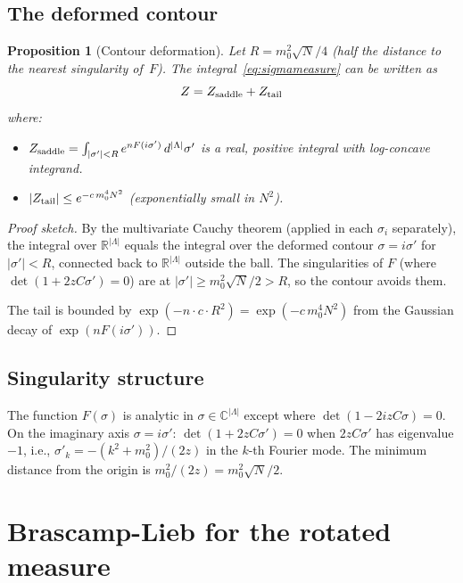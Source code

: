 \documentclass[12pt]{article}
\newtheorem{proposition}[theorem]{Proposition}
\theoremstyle{definition}
\theoremstyle{remark}
\newcommand{\R}{\mathbb{R}}
\newcommand{\C}{\mathbb{C}}
\newcommand{\La}{\Lambda}
\begin{document}
\subsection{The deformed contour}

\begin{proposition}[Contour deformation]
\label{prop:contour}
Let $R = m_0^2\sqrt{N}/4$ (half the distance to the nearest
singularity of~$F$). The integral~\eqref{eq:sigmameasure}
can be written as
\begin{equation}
\label{eq:split}
  Z = Z_{\rm saddle} + Z_{\rm tail}
\end{equation}
where:
\begin{itemize}
\item $Z_{\rm saddle} = \int_{|\sigma'|<R}
  e^{nF(i\sigma')}\,d^{|\La|}\sigma'$
  is a real, positive integral with log-concave integrand.
\item $|Z_{\rm tail}| \le e^{-c\,m_0^4 N^2}$ (exponentially small
  in $N^2$).
\end{itemize}
\end{proposition}

\begin{proof}[Proof sketch]
By the multivariate Cauchy theorem (applied in each $\sigma_i$
separately), the integral over $\R^{|\La|}$ equals the integral
over the deformed contour $\sigma = i\sigma'$ for $|\sigma'|<R$,
connected back to $\R^{|\La|}$ outside the ball. The singularities
of $F$ (where $\det(1+2zC\sigma')=0$) are at
$|\sigma'| \ge m_0^2\sqrt{N}/2 > R$, so the contour avoids them.

The tail is bounded by $\exp(-n\cdot c\cdot R^2)
= \exp(-c\,m_0^4 N^2)$ from the Gaussian decay of $\exp(nF(i\sigma'))$.
\end{proof}

\subsection{Singularity structure}

The function $F(\sigma)$ is analytic in $\sigma \in \C^{|\La|}$
except where $\det(1-2izC\sigma) = 0$. On the imaginary axis
$\sigma = i\sigma'$: $\det(1+2zC\sigma') = 0$ when $2zC\sigma'$
has eigenvalue $-1$, i.e., $\sigma'_k = -(k^2+m_0^2)/(2z)$ in
the $k$-th Fourier mode. The minimum distance from the origin is
$m_0^2/(2z) = m_0^2\sqrt{N}/2$.

\section{Brascamp-Lieb for the rotated measure}
\end{document}
